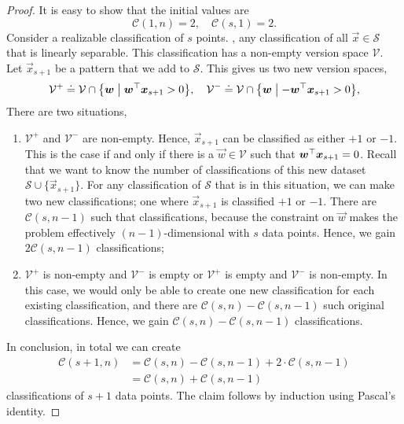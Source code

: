 \begin{proof}
    It is easy to show that the initial values are \[
        \mathcal{C}(1,n) = 2, \quad \mathcal{C}(s, 1) = 2.
    \]
    Consider a realizable classification of $s$ points. \Ie, any classification of all $\vec{x} \in
        \mathcal{S}$ that is linearly separable. This classification has a non-empty version space
    $\mathcal{V}$. Let $\vec{x}_{s+1}$ be a pattern that we add to $\mathcal{S}$. This gives us two new
    version spaces, \[
        \mathcal{V}^+ \doteq \mathcal{V} \cap \lft\{ \vec{w} \;\middle|\; \transpose{\vec{w}} \vec{x}_{s+1} > 0 \rgt\}, \quad \mathcal{V}^- \doteq \mathcal{V} \cap \lft\{ \vec{w} \;\middle|\; -\transpose{\vec{w}} \vec{x}_{s+1} > 0 \rgt\},
    \]
    There are two situations,
    \begin{enumerate}
        \item $\mathcal{V}^+$ and $\mathcal{V}^-$ are non-empty. Hence, $\vec{x}_{s+1}$ can be
              classified as either $+1$ or $-1$. This is the case if and only if there is a
              $\vec{w} \in \mathcal{V}$ such that $\bm{w}^\top \bm{x}_{s+1} = 0$. Recall that we want to know the number of classifications of
              this new dataset $\mathcal{S} \cup \{ \vec{x}_{s+1} \}$. For any classification of
              $\mathcal{S}$ that is in this situation, we can make two new classifications; one
              where $\vec{x}_{s+1}$ is classified $+1$ or $-1$. There are $\mathcal{C}(s,n-1)$ such
              that classifications, because the constraint on $\vec{w}$ makes the problem effectively
              $(n-1)$-dimensional with $s$ data points. Hence, we gain $2 \mathcal{C}(s,n-1)$ classifications;

        \item $\mathcal{V}^+$ is non-empty and $\mathcal{V}^-$ is empty or $\mathcal{V}^+$ is empty
              and $\mathcal{V}^-$ is non-empty. In this case, we would only be able to create one new
              classification for each existing classification, and there are $\mathcal{C}(s,n) -
                  \mathcal{C}(s,n-1)$ such original classifications. Hence, we gain $\mathcal{C}(s,n) - \mathcal{C}(s,n-1)$ classifications.
    \end{enumerate}
    In conclusion, in total we can create
    \begin{align*}
        \mathcal{C}(s+1,n) & = \mathcal{C}(s,n) - \mathcal{C}(s,n-1) + 2 \cdot \mathcal{C}(s,n-1) \\
                           & = \mathcal{C}(s,n) + \mathcal{C}(s,n-1)
    \end{align*}
    classifications of $s+1$ data points. The claim follows by induction using Pascal's identity.
\end{proof}

